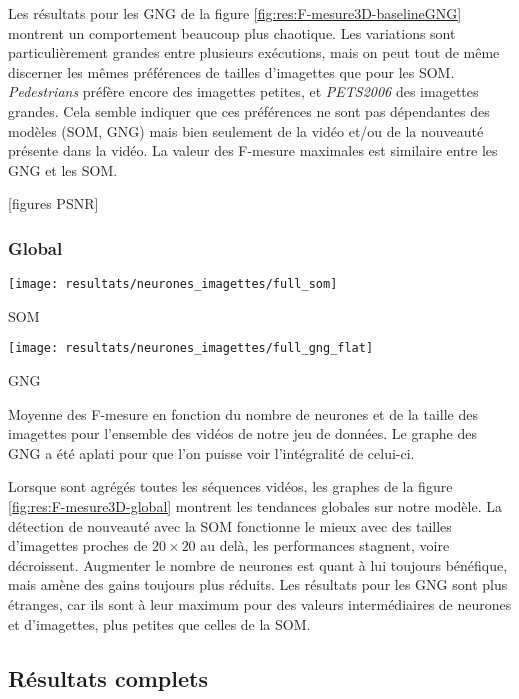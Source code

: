 	Les résultats pour les GNG de la figure \ref{fig:res:F-mesure3D-baselineGNG} montrent un comportement beaucoup plus chaotique. Les variations sont particulièrement grandes entre plusieurs exécutions, mais on peut tout de même discerner les mêmes préférences de tailles d'imagettes que pour les SOM. \textit{Pedestrians} préfère encore des imagettes petites, et \textit{PETS2006} des imagettes grandes. Cela semble indiquer que ces préférences ne sont pas dépendantes des modèles (SOM, GNG) mais bien seulement de la vidéo et/ou de la nouveauté présente dans la vidéo. La valeur des F-mesure maximales est similaire entre les GNG et les SOM. 

	[figures PSNR]
	
	\subsubsection{Global}

	\begin{figureth}
		\begin{subfigureth}{.49\textwidth}
			\texttt{[image: resultats/neurones\_imagettes/full\_som]}\caption{SOM}
		\end{subfigureth}
		\begin{subfigureth}{.49\textwidth}
			\texttt{[image: resultats/neurones\_imagettes/full\_gng\_flat]}\caption{GNG}
		\end{subfigureth}
		\caption[F-mesure en fonction du nombre de neurones et de la taille des imagettes, global]{Moyenne des F-mesure en fonction du nombre de neurones et de la taille des imagettes pour l'ensemble des vidéos de notre jeu de données. Le graphe des GNG a été aplati pour que l'on puisse voir l'intégralité de celui-ci.}\label{fig:res:F-mesure3D-global}
	\end{figureth}

	Lorsque sont agrégés toutes les séquences vidéos, les graphes de la figure \ref{fig:res:F-mesure3D-global} montrent les tendances globales sur notre modèle. La détection de nouveauté avec la SOM fonctionne le mieux avec des tailles d'imagettes proches de $20\times20$ au delà, les performances stagnent, voire décroissent. Augmenter le nombre de neurones est quant à lui toujours bénéfique, mais amène des gains toujours plus réduits. Les résultats pour les GNG sont plus étranges, car ils sont à leur maximum pour des valeurs intermédiaires de neurones et d'imagettes, plus petites que celles de la SOM.

	\subsection{Résultats complets}

